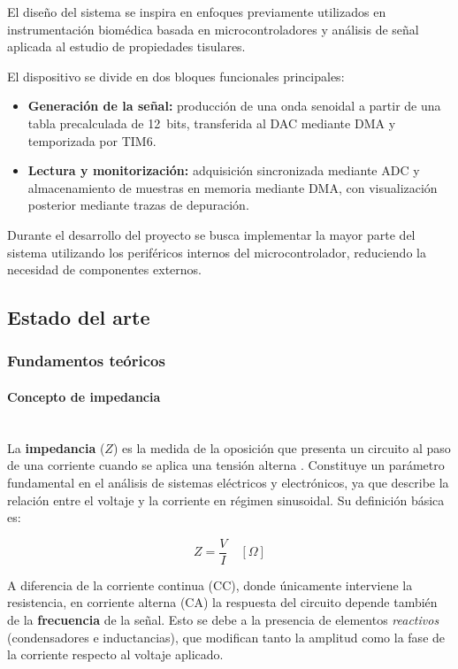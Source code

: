 \documentclass[11pt,a4paper]{article}
\newcommand{\myparagraph}[1]{\paragraph{#1}\mbox{}\\}
\begin{document}
El diseño del sistema se inspira en enfoques previamente utilizados en instrumentación biomédica basada en microcontroladores y análisis de señal aplicada al estudio de propiedades tisulares.

El dispositivo se divide en dos bloques funcionales principales:

\begin{itemize}
    \item \textbf{Generación de la señal:} producción de una onda senoidal a partir de una tabla precalculada de 12~bits, transferida al DAC mediante DMA y temporizada por TIM6.

    \item \textbf{Lectura y monitorización:} adquisición sincronizada mediante ADC y almacenamiento de muestras en memoria mediante DMA, con visualización posterior mediante trazas de depuración.
\end{itemize}

Durante el desarrollo del proyecto se busca implementar la mayor parte del sistema utilizando los periféricos internos del microcontrolador, reduciendo la necesidad de componentes externos.

\subsection{Estado del arte}

\subsubsection{Fundamentos teóricos}

\myparagraph{Concepto de impedancia}

La \textbf{impedancia} (\(Z\)) es la medida de la oposición que presenta un circuito al paso de una corriente cuando se aplica una tensión alterna \cite{hayt2012}. Constituye un parámetro fundamental en el análisis de sistemas eléctricos y electrónicos, ya que describe la relación entre el voltaje y la corriente en régimen sinusoidal. Su definición básica es:

\[
Z = \frac{V}{I} \quad [\Omega]
\]

A diferencia de la corriente continua (CC), donde únicamente interviene la resistencia, en corriente alterna (CA) la respuesta del circuito depende también de la \textbf{frecuencia} de la señal. Esto se debe a la presencia de elementos \emph{reactivos} (condensadores e inductancias), que modifican tanto la amplitud como la fase de la corriente respecto al voltaje aplicado.
\end{document}
